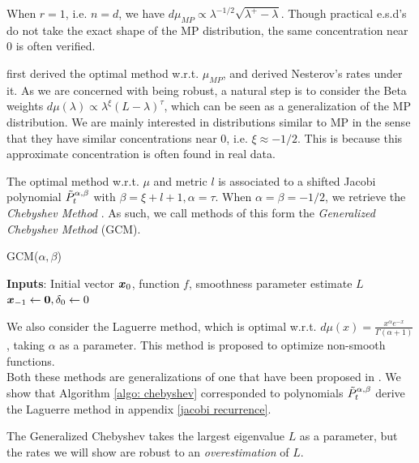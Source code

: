 \documentclass{article}
\begin{document}
When $r=1$, i.e. $n=d$, we have $d\mu_{MP}\propto \lambda^{-1/2}\sqrt{\lambda^+-\lambda}$. Though practical e.s.d's do not take the exact shape of the MP distribution, the same concentration near $0$ is often verified.


\cite{pedregosa2020acceleration} first derived the optimal method w.r.t. $\mu_{MP}$, and \cite{paquette2020halting} derived Nesterov's rates under it. As we are concerned with being robust, a natural step is to consider the Beta weights $d\mu(\lambda)\propto\lambda^\xi(L-\lambda)^\tau$, which can be seen as a generalization of the MP distribution.  We are mainly interested in  distributions similar to MP in the sense that they have similar concentrations near $0$, i.e. $\xi\approx -1/2$. This is because this approximate concentration is often found in real data.


The optimal method w.r.t. $\mu$ and metric $l$ is associated to a shifted Jacobi polynomial $\Tilde{P}_t^{\alpha,\beta}$ with $\beta=\xi+l+1, \alpha=\tau$. When $\alpha=\beta=-1/2$, we retrieve the \textit{Chebyshev Method} \citep{flanders1950numerical}. As such, we call methods of this form the \textit{Generalized Chebyshev Method} (GCM). 
\begin{algorithm}
\caption{GCM($\alpha,\beta$)}
\textbf{Inputs}: Initial vector ${\boldsymbol x}_0$, function $f$, smoothness parameter estimate $L$  \\


${\boldsymbol x}_{-1}\gets \textbf{0},\delta_0\gets0$   \\
 \label{algo: chebyshev}
\end{algorithm}

We  also consider the Laguerre method, which is optimal w.r.t. $d\mu(x)=\frac{x^\alpha e^{-x}}{\Gamma(\alpha+1)}$, taking $\alpha$ as a parameter. This method is proposed to optimize non-smooth functions.\\
Both these methods are generalizations of one that have been proposed in \cite{pedregosa2020acceleration}. We show that Algorithm \ref{algo: chebyshev} corresponded to polynomials $\Tilde{P}_t^{\alpha,\beta}$ derive the Laguerre method in appendix \ref{jacobi recurrence}.\\
\begin{remark}
The Generalized Chebyshev takes the largest eigenvalue $L$ as a parameter, but the rates we will show are robust to an \textit{overestimation} of $L$.
\end{remark}
\end{document}

